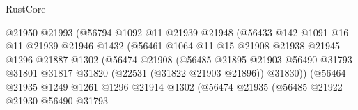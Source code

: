 \begin{lexlean}{RustCore}
\begin{coremodule}
                                      @21950
                                      @21993
                                      (@56794
                                        @1092
                                        @11
                                        @21939
                                        @21948
                                        (@56433
                                          @142
                                          @1091
                                          @16
                                          @11
                                          @21939
                                          @21946
                                          @1432
                                          (@56461
                                            @1064
                                            @11
                                            @15
                                            @21908
                                            @21938
                                            @21945
                                            @1296
                                            @21887
                                            @1302
                                            (@56474
                                              @21908
                                              (@56485
                                                @21895
                                                @21903
                                                @56490
                                                @31793
                                                @31801
                                                @31817
                                                @31820
                                                (@22531 (@31822 @21903 @21896))
                                                @31830))
                                            (@56464
                                              @21935
                                              @1249
                                              @1261
                                              @1296
                                              @21914
                                              @1302
                                              (@56474
                                                @21935
                                                (@56485
                                                  @21922
                                                  @21930
                                                  @56490
                                                  @31793

\end{coremodule}
\end{lexlean}
